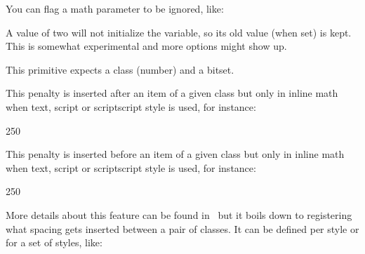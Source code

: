 \startnewprimitive[title={\prm {setmathignore}}]

You can flag a math parameter to be ignored, like:

\starttyping
\setmathignore {}
\setmathignore {}
\setmathignore {}
\setmathignore {}
\setmathignore {}
\stoptyping

A value of two will not initialize the variable, so its old value (when set) is
kept. This is somewhat experimental and more options might show up.

\stopnewprimitive

\startnewprimitive[title={\prm {setmathoptions}}]

This primitive expects a class (number) and a bitset.

\testpage[2]

\starttworows
{}%
\stoptworows

\stopnewprimitive

\startnewprimitive[title={\prm {setmathpostpenalty}}]

This penalty is inserted after an item of a given class but only in inline math
when text, script or scriptscript style is used, for instance:

\starttyping
{} 250
\stoptyping

\stopnewprimitive

\startnewprimitive[title={\prm {setmathprepenalty}}]

This penalty is inserted before an item of a given class but only in inline math
when text, script or scriptscript style is used, for instance:

\starttyping
{} 250
\stoptyping

\stopnewprimitive

\startnewprimitive[title={\prm {setmathspacing}}]

More details about this feature can be found in \CONTEXT\ but it boils down to
registering what spacing gets inserted between a pair of classes. It can be
defined per style or for a set of styles, like:

\starttyping
\inherited\setmathspacing
  \mathimplicationcode \mathbinarycode
  \alldisplaystyles \thickermuskip
\inherited\setmathspacing
  \mathradicalcode \mathmiddlecode
  \allunsplitstyles \pettymuskip
\stoptyping

